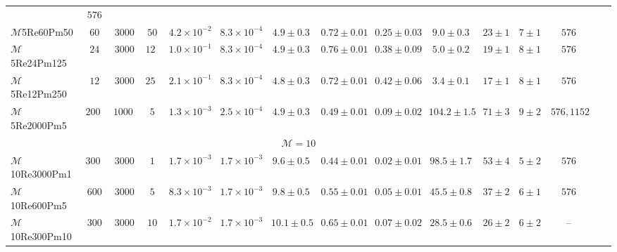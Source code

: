 \documentclass[12pt,twoside]{extreport}
\newcommand{\mSonicMach}{\ensuremath{\mathcal{M}}} %
\begin{document}
\begin{table}
{{\begin{threeparttable}
\begin{tabular}{l c c c c c c c c c c c c c c}
	& $576$ \\
$\mSonicMach$5Re60Pm50
	& $60$ & $3000$ & $50$
	& $4.2 \times 10^{-2}$ & $8.3 \times 10^{-4}$ & $4.9 \pm 0.3$
	& $0.72 \pm 0.01$ & $0.25 \pm 0.03$
	& $9.0 \pm 0.3$ & $23 \pm 1$ & $7 \pm 1$
	& $576$ \\
$\mSonicMach$5Re24Pm125
	& $24$ & $3000$ & $125$
	& $1.0 \times 10^{-1}$ & $8.3 \times 10^{-4}$ & $4.9 \pm 0.3$
	& $0.76 \pm 0.01$ & $0.38 \pm 0.09$
	& $5.0 \pm 0.2$ & $19 \pm 1$ & $8 \pm 1$
	& $576$ \\
$\mSonicMach$5Re12Pm250
	& $12$ & $3000$ & $250$
	& $2.1 \times 10^{-1}$ & $8.3 \times 10^{-4}$ & $4.8 \pm 0.3$
	& $0.72 \pm 0.01$ & $0.42 \pm 0.06$
	& $3.4 \pm 0.1$ & $17 \pm 1$ & $8 \pm 1$
	& $576$ \\
$\mSonicMach$5Re2000Pm5
	& $2000$ & $10000$ & $5$
	& $1.3 \times 10^{-3}$ & $2.5 \times 10^{-4}$ & $4.9 \pm 0.3$
	& $0.49 \pm 0.01$ & $0.09 \pm 0.02$
	& $104.2 \pm 1.5$ & $71 \pm 3$ & $9 \pm 2$
	& $576, 1152$ \\
\hline
\multicolumn{13}{c}{$\mSonicMach = 10$} \\
\hline
$\mSonicMach$10Re3000Pm1
	& $3000$ & $3000$ & $1$
	& $1.7 \times 10^{-3}$ & $1.7 \times 10^{-3}$ & $9.6 \pm 0.5$
	& $0.44 \pm 0.01$ & $0.02 \pm 0.01$
	& $98.5 \pm 1.7$ & $53 \pm 4$ & $5 \pm 2$
	& $576$ \\
$\mSonicMach$10Re600Pm5
	& $600$ & $3000$ & $5$
	& $8.3 \times 10^{-3}$ & $1.7 \times 10^{-3}$ & $9.8 \pm 0.5$
	& $0.55 \pm 0.01$ & $0.05 \pm 0.01$
	& $45.5 \pm 0.8$ & $37 \pm 2$ & $6 \pm 1$
	& $576$ \\
$\mSonicMach$10Re300Pm10
	& $300$ & $3000$ & $10$
	& $1.7 \times 10^{-2}$ & $1.7 \times 10^{-3}$ & $10.1 \pm 0.5$
	& $0.65 \pm 0.01$ & $0.07 \pm 0.02$
	& $28.5 \pm 0.6$ & $26 \pm 2$ & $6 \pm 2$
	& -- \\
\hline
\hline
\end{tabular}


\end{threeparttable}}}
\end{table}
\end{document}
